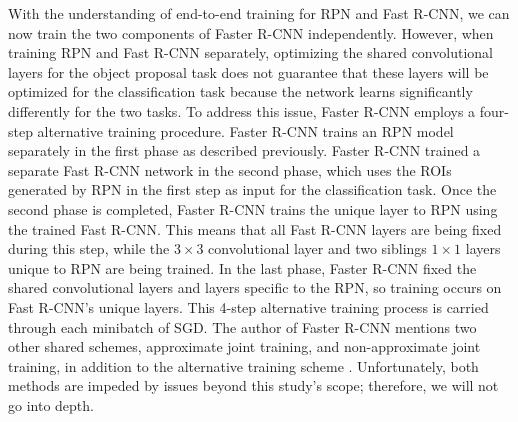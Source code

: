 With the understanding of end-to-end training for RPN and Fast R-CNN, we can now train the two components of Faster R-CNN independently. However, when training RPN and Fast R-CNN separately, optimizing the shared convolutional layers for the object proposal task does not guarantee that these layers will be optimized for the classification task because the network learns significantly differently for the two tasks. To address this issue, Faster R-CNN employs a four-step alternative training procedure. Faster R-CNN trains an RPN model separately in the first phase as described previously. Faster R-CNN trained a separate Fast R-CNN network in the second phase, which uses the ROIs generated by RPN in the first step as input for the classification task. Once the second phase is completed, Faster R-CNN trains the unique layer to RPN using the trained Fast R-CNN. This means that all Fast R-CNN layers are being fixed during this step, while the $3 \times 3$ convolutional layer and two siblings $1 \times 1$ layers unique to RPN are being trained. In the last phase, Faster R-CNN fixed the shared convolutional layers and layers specific to the RPN, so training occurs on Fast R-CNN's unique layers. This 4-step alternative training process is carried through each minibatch of SGD. The author of Faster R-CNN mentions two other shared schemes, approximate joint training, and non-approximate joint training, in addition to the alternative training scheme \cite{faster_rcnn_2015}. Unfortunately, both methods are impeded by issues beyond this study's scope; therefore, we will not go into depth.
